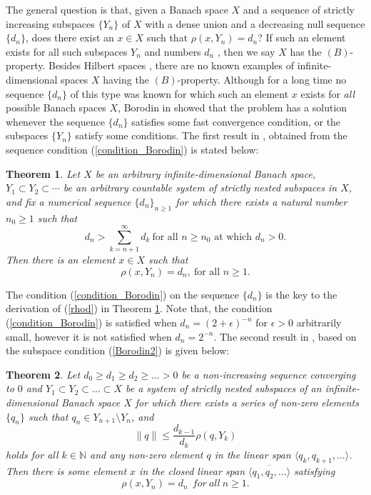 \documentclass[12pt, reqno]{amsart}
\newtheorem{theorem}{Theorem}[section]
\theoremstyle{definition}
\theoremstyle{remark}
\numberwithin{equation}{section}
\begin{document}
 The general question is that, given a Banach space $X$ and a sequence of strictly increasing subspaces $\{Y_n\}$ of $X$  with a dense union and a decreasing null sequence $ \{d_n\}$, does there exist an $x\in X$ such that $\rho(x, Y_n) =d_n$? If such an element exists for all such subspaces $Y_n$ and numbers $d_n$ , then we say $X$ has the $(B)$-property. Besides Hilbert spaces \cite{Tyu2},  there are no known examples of infinite-dimensional  spaces $X$ having the $(B)$-property.
  Although for a long time no sequence $\{d_n\}$ of this type was known for which such an element $x$ exists for \textit{all} possible Banach spaces $X$, Borodin in \cite{Borodin1} showed that the problem has a solution whenever the sequence $\{d_n\}$ satisfies some fast convergence condition, or the subspaces $\{Y_n\}$ satisfy some  conditions. The first result in \cite{Borodin1}, obtained from the sequence condition (\ref{condition_Borodin}) is stated below:
\begin{theorem}{\cite[p. 624]{Borodin1}}
  \label{thm:Borodin1}
  Let $X$ be an arbitrary infinite-dimensional Banach space, $Y_1 \subset Y_2
  \subset \cdots$ be an arbitrary countable system of strictly nested subspaces
  in $X$, and fix a numerical sequence $\{d_n\}_{n\ge1}$ for which there exists a natural number $n_0\ge1$ such that
  \begin{equation}
  \label{condition_Borodin}
  d_n >
  \sum_{k = n+1}^\infty d_k~\mbox{for all $n \ge n_0$ at which $d_n > 0$.}
  \end{equation}
  Then there is an element $x \in X$ such that
  \begin{equation}
  \label{rhod}
  \rho(x,Y_n) = d_n, ~\mbox{for all $n\ge1$}.
  \end{equation}
\end{theorem}
The condition (\ref{condition_Borodin}) on the sequence $\{d_n\}$ is the key to the derivation of (\ref{rhod}) in Theorem \ref{thm:Borodin1}.  Note that, the condition (\ref{condition_Borodin}) is satisfied when $d_n =(2+\epsilon)^{-n} $ for $\epsilon > 0$ arbitrarily small, however it is not satisfied when $d_n= 2^{-n}$. 
The second result in \cite{Borodin1}, based on the subspace condition (\ref{Borodin2}) is given below:
\begin{theorem}{\cite[p. 626]{Borodin1}}
\label{thm:Borodin2}
	Let $d_0\ge d_1 \geq d_2 \geq \dots > 0$ be a non-increasing sequence converging to $0$ and $Y_1 \subset Y_2 \subset \dots \subset X$ be a system of strictly nested subspaces of  an infinite-dimensional Banach space $X$ for which there exists a series of non-zero elements $\{q_n\}$ such that $q_n \in Y_{n + 1} \setminus Y_n$, and
\begin{equation}
	\label{Borodin2}
\|q\| \leq \displaystyle \frac{d_{k-1}}{d_{k}}\rho(q,Y_k)
\end{equation}
holds for all $k \in \mathbb N$ and any non-zero element $q$ in the linear span $\langle q_k, q_{k + 1},\dots \rangle$. Then there is some element $x$ in the closed linear span $\overline{\langle q_1, q_2,\dots \rangle}$ satisfying $$\rho(x,Y_n) = d_n ~~for ~all ~n \ge1.$$
\end{theorem}
\end{document}
